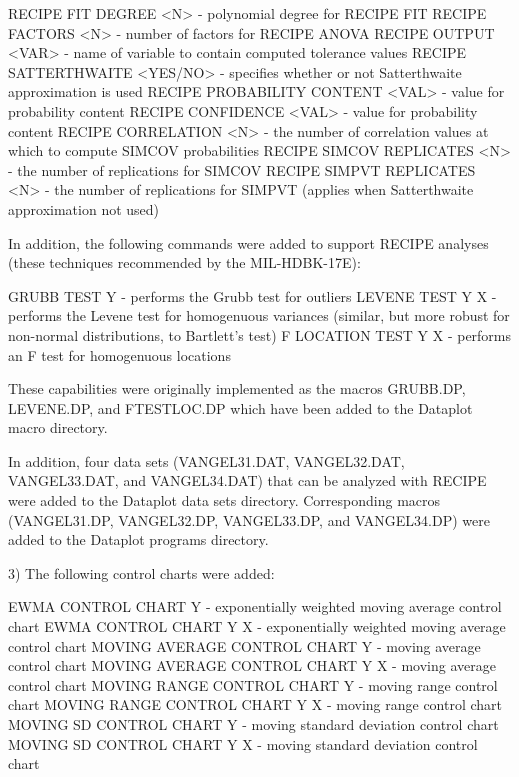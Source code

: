 {      RECIPE FIT DEGREE <N>            - polynomial degree for RECIPE FIT
      RECIPE FACTORS <N>               - number of factors for RECIPE ANOVA
      RECIPE OUTPUT <VAR>              - name of variable to contain computed 
                                         tolerance values
      RECIPE SATTERTHWAITE <YES/NO>    - specifies whether or not Satterthwaite
                                         approximation is used
      RECIPE PROBABILITY CONTENT <VAL> - value for probability content
      RECIPE CONFIDENCE <VAL>          - value for probability content
      RECIPE CORRELATION <N>           - the number of correlation values at
                                         which to compute SIMCOV probabilities
      RECIPE SIMCOV REPLICATES <N>     - the number of replications for SIMCOV
      RECIPE SIMPVT REPLICATES <N>     - the number of replications for SIMPVT
                                         (applies when Satterthwaite
                                         approximation not used)

    In addition, the following commands were added to support RECIPE
    analyses (these techniques recommended by the MIL-HDBK-17E):

      GRUBB TEST Y        - performs the Grubb test for outliers
      LEVENE TEST Y X     - performs the Levene test for homogenuous variances
                            (similar, but more robust for non-normal distributions,
                            to Bartlett's test)
      F LOCATION TEST Y X - performs an F test for homogenuous locations

    These capabilities were originally implemented as the macros GRUBB.DP, LEVENE.DP,
    and FTESTLOC.DP which have been added to the Dataplot macro directory.

    In addition, four data sets (VANGEL31.DAT, VANGEL32.DAT, VANGEL33.DAT, and
    VANGEL34.DAT) that can be analyzed with RECIPE were added to the Dataplot
    data sets directory.  Corresponding macros (VANGEL31.DP, VANGEL32.DP, VANGEL33.DP,
    and VANGEL34.DP) were added to the Dataplot programs directory.

 3) The following control charts were added:

      EWMA  CONTROL CHART Y      - exponentially weighted moving average control chart
      EWMA  CONTROL CHART Y X    - exponentially weighted moving average control chart
      MOVING AVERAGE CONTROL CHART Y   - moving average control chart
      MOVING AVERAGE CONTROL CHART Y X - moving average control chart
      MOVING RANGE CONTROL CHART Y     - moving range control chart
      MOVING RANGE CONTROL CHART Y X   - moving range control chart
      MOVING SD CONTROL CHART Y        - moving standard deviation control chart
      MOVING SD CONTROL CHART Y X      - moving standard deviation control chart

}
